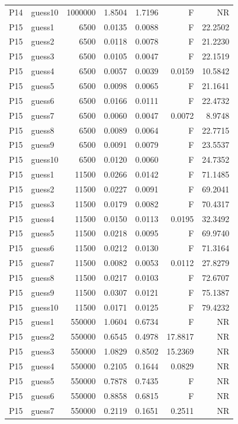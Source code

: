 {\begin{longtable}{llrrrrr}
P14 & guess10 & 1000000 & 1.8504 & 1.7196 & F & NR \\
P15 & guess1 & 6500 & 0.0135 & 0.0088 & F & 22.2502 \\
P15 & guess2 & 6500 & 0.0118 & 0.0078 & F & 21.2230 \\
P15 & guess3 & 6500 & 0.0105 & 0.0047 & F & 22.1519 \\
P15 & guess4 & 6500 & 0.0057 & 0.0039 & 0.0159 & 10.5842 \\
P15 & guess5 & 6500 & 0.0098 & 0.0065 & F & 21.1641 \\
P15 & guess6 & 6500 & 0.0166 & 0.0111 & F & 22.4732 \\
P15 & guess7 & 6500 & 0.0060 & 0.0047 & 0.0072 & 8.9748 \\
P15 & guess8 & 6500 & 0.0089 & 0.0064 & F & 22.7715 \\
P15 & guess9 & 6500 & 0.0091 & 0.0079 & F & 23.5537 \\
P15 & guess10 & 6500 & 0.0120 & 0.0060 & F & 24.7352 \\
P15 & guess1 & 11500 & 0.0266 & 0.0142 & F & 71.1485 \\
P15 & guess2 & 11500 & 0.0227 & 0.0091 & F & 69.2041 \\
P15 & guess3 & 11500 & 0.0179 & 0.0082 & F & 70.4317 \\
P15 & guess4 & 11500 & 0.0150 & 0.0113 & 0.0195 & 32.3492 \\
P15 & guess5 & 11500 & 0.0218 & 0.0095 & F & 69.9740 \\
P15 & guess6 & 11500 & 0.0212 & 0.0130 & F & 71.3164 \\
P15 & guess7 & 11500 & 0.0082 & 0.0053 & 0.0112 & 27.8279 \\
P15 & guess8 & 11500 & 0.0217 & 0.0103 & F & 72.6707 \\
P15 & guess9 & 11500 & 0.0307 & 0.0121 & F & 75.1387 \\
P15 & guess10 & 11500 & 0.0171 & 0.0125 & F & 79.4232 \\
P15 & guess1 & 550000 & 1.0604 & 0.6734 & F & NR \\
P15 & guess2 & 550000 & 0.6545 & 0.4978 & 17.8817 & NR \\
P15 & guess3 & 550000 & 1.0829 & 0.8502 & 15.2369 & NR \\
P15 & guess4 & 550000 & 0.2105 & 0.1644 & 0.0829 & NR \\
P15 & guess5 & 550000 & 0.7878 & 0.7435 & F & NR \\
P15 & guess6 & 550000 & 0.8858 & 0.6815 & F & NR \\
P15 & guess7 & 550000 & 0.2119 & 0.1651 & 0.2511 & NR \\

\end{longtable}}
